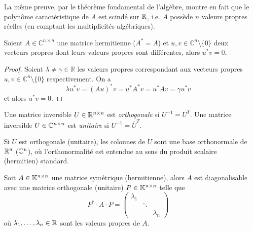 \begin{remark}
La même preuve, par le théorème fondamental de l'algèbre, montre en fait que le polynôme caractéristique de $A$ est scindé sur $\Bbb R$, i.e. $A$ possède $n$ valeurs propres réelles (en comptant les multiplicités algébriques).
\end{remark}



\begin{lemma}
  \label{lem:9}
  Soient $A ∈ ℂ^{n ×n}$ une matrice hermitienne ($A^* = A$) et  $u,v ∈ ℂ^n \setminus \{0\}$ deux vecteurs propres dont leurs valeurs propres  sont différentes, alors $u^* v=0$. 
\end{lemma}

\begin{proof}
  Soient $\lambda \neq \gamma ∈ ℝ$ les valeurs propres correspondant aux vecteurs propres $u,v ∈ ℂ^n \setminus \{0\}$ respectivement. On a
  \begin{displaymath}
    \lambda u^* v =  (Au)^* v  = u^* A^* v = u^* A v = \gamma u^* v
  \end{displaymath}
  et alors $u^* v =0$.
\end{proof}



\begin{definition}
  \label{def:20}
  Une matrice inversible  $U \in \mathbb{R}^{n \times n}$ est \emph{orthogonale} si $ U^{-1}= U^T $.  Une matrice inversible $U \in \mathbb{C}^{n \times n}$ est \emph{unitaire} si $U^{-1} = \overline{U}^T$. 
\end{definition}
\noindent 
Si $U$ est orthogonale (unitaire), les  colonnes de $U$ sont une base orthonormale de $\mathbb{R}^n$ ($\mathbb{C}^n$), où l'orthonormalité est entendue au sens du produit scalaire (hermitien) standard. 





\begin{theorem}
\label{thr:16}
  Soit $A \in \mathbb{K}^{n\times n}$ une matrice symétrique (hermitienne), alors $A$ est diagonalisable avec une matrice orthogonale (unitaire) $P \in \mathbb{K}^{n \times n}$ telle que 
  \begin{equation}
    \label{diagonal}
    P^* \cdot A \cdot P =
    \begin{pmatrix}
      \lambda_1 \\
      & \ddots \\
      && \lambda_n
    \end{pmatrix}
  \end{equation}
  où $\lambda_1,\dots,\lambda_n \in \mathbb{R}$ sont les valeurs propres de $A$. 
\end{theorem}


